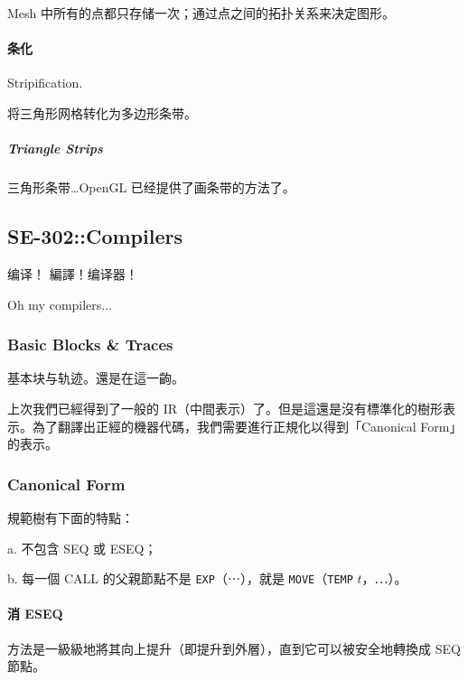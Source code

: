 \documentclass[
]{article}
\begin{document}
Mesh 中所有的点都只存储一次；通过点之间的拓扑关系来决定图形。

\hypertarget{header-n171}{%
\paragraph{条化}\label{header-n171}}

Stripification.

将三角形网格转化为多边形条带。

\hypertarget{header-n174}{%
\subparagraph{Triangle Strips}\label{header-n174}}

三角形条带\ldots OpenGL 已经提供了画条带的方法了。

\hypertarget{header-n176}{%
\subsection{SE-302::Compilers}\label{header-n176}}

编译！ 編譯！编译器！

Oh my compilers...

\hypertarget{header-n179}{%
\subsubsection{Basic Blocks \& Traces}\label{header-n179}}

基本块与轨迹。還是在這一齣。

上次我們已經得到了一般的
IR（中間表示）了。但是這還是沒有標準化的樹形表示。為了翻譯出正經的機器代碼，我們需要進行正規化以得到「Canonical
Form」的表示。

\hypertarget{header-n182}{%
\subsubsection{Canonical Form}\label{header-n182}}

規範樹有下面的特點：

a. 不包含 SEQ 或 ESEQ；

b. 每一個 CALL 的父親節點不是 \texttt{EXP}（⋯），就是
\texttt{MOVE}（\texttt{\textasciigrave{}TEMP} \(t\)，⋯）。

\hypertarget{header-n186}{%
\paragraph{消 ESEQ}\label{header-n186}}

方法是一級級地將其向上提升（即提升到外層），直到它可以被安全地轉換成 SEQ
節點。
\end{document}
